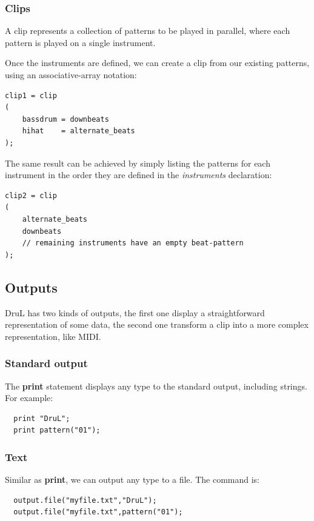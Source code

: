 \documentclass[11pt,twoside]{article}
\begin{document}
\subsubsection{Clips}

A clip represents a collection of patterns to be played in parallel, where each pattern is played on a single instrument.

Once the instruments are defined, we can create a clip from our existing patterns, using an
associative-array notation:

\begin{verbatim}
clip1 = clip
(
    bassdrum = downbeats
    hihat    = alternate_beats
);
\end{verbatim}

The same result can be achieved by simply listing the patterns for each instrument in the order they are defined in the \textit{instruments} declaration:
\begin{verbatim}
clip2 = clip
(
    alternate_beats
    downbeats
    // remaining instruments have an empty beat-pattern
);

\end{verbatim}




\subsection{Outputs}
DruL has two kinds of outputs, the first one display a straightforward
representation of some data, the second one transform a clip into a
more complex representation, like MIDI.

\subsubsection{Standard output}
The \textbf{print} statement displays any type to the standard
output, including strings. For example:
\begin{verbatim}
  print "DruL";
  print pattern("01");
\end{verbatim}

\subsubsection{Text}
Similar as \textbf{print}, we can output any type to a file. The command
is:
\begin{verbatim}
  output.file("myfile.txt","DruL");
  output.file("myfile.txt",pattern("01");
\end{verbatim}
\end{document}
